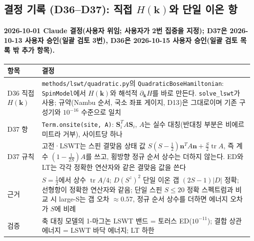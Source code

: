 \subsection{결정 기록 (D36--D37): 직접 $H(\mathbf k)$와 단일 이온 항}\label{decisions-d36-onsite}
\begingroup%
  \framesubtitle{2026-10-01 Claude 결정(사용자 위임; 사용자가 2번 집중을 지정); D37은 2026-10-13 사용자 승인(일괄 검토 3번), D36은 2026-10-15 사용자 승인(일괄 검토 목록 밖 추가 항목).}
  \small\renewcommand{\arraystretch}{1.12}
  \begin{tabularx}{\textwidth}{@{}P{3.0cm}Y@{}}
    \toprule
    항목 & 결정 \\
    \midrule
    D36 직접 $H(\mathbf k)$ & \texttt{methods/lswt/quadratic.py}의 \texttt{QuadraticBoseHamiltonian}: \texttt{SpinModel}에서 $H(\mathbf k)$와 해석적 $\partial_{\mathbf k}H$를 바로 만든다. \texttt{solve\_lswt}가 사용; 규약(Nambu 순서, 국소 좌표 게이지, D13)은 그대로이며 기존 구성기와 $10^{-16}$ 수준으로 일치 \\
    D37 항 & \texttt{Term.onsite(site, A)}: $\mathbf S_i^{T}A\mathbf S_i$, $A$는 실수 대칭(반대칭 부분은 비에르미트라 거부), 사이트당 하나 \\
    D37 규칙 & 고전·LSWT는 스핀 결맞음 상태 값 $S(S-\tfrac12)\mathbf n^{T}A\mathbf n+\tfrac S2\operatorname{tr}A$, 즉 계수 $(1-\tfrac1{2S})A$를 쓰고, 횡방향 정규 순서 상수는 더하지 않는다. ED와 LT는 각각 정확한 연산자와 같은 결맞음 값을 쓴다 \\
    근거 & $S=\tfrac12$에서 상수 $\operatorname{tr}A/4$; $D(S^z)^2$ 단일 이온 갭 $(2S-1)|D|$ 정확; 선형항이 정확한 연산자와 같음; 단일 스핀 $S\le20$ 정확 스펙트럼과 비교 시 large-S는 갭 오차 $\approx0.57$, 정규 순서 상수를 더하면 에너지 오차가 $S$에 비례 \\
    검증 & 축 대칭 모델의 1-마그논 LSWT 밴드 = 토러스 ED($10^{-11}$); 결합 상관 에너지 = LSWT 바닥 에너지; LT 하한 \\
    \bottomrule
  \end{tabularx}
\endgroup


